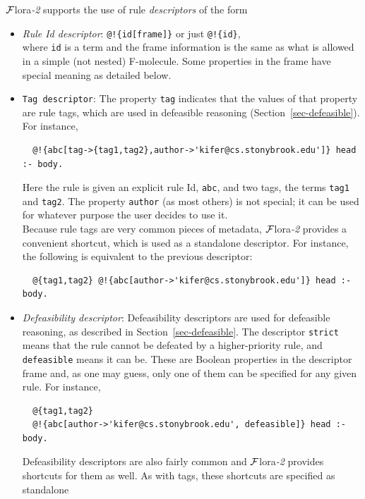\documentclass[11pt]{article}
\newcommand{\FLORA}{{\mbox{\sc ${\cal F}${lora}\rm\emph{-2}}}\xspace}
\begin{document}
\FLORA supports the use of rule \emph{descriptors} of the form
\begin{itemize}
\item  \emph{Rule Id descriptor}:   \texttt{@!\{id[frame]\}}  or just \texttt{@!\{id\}}, \\
  where \texttt{id} is a term and the frame information is the same as what
  is allowed in a simple (not nested) F-molecule.
  Some properties in the frame have special meaning as detailed below.
\item \texttt{Tag descriptor}:
  The property \texttt{tag} indicates that the values of that property are
  rule tags, which are used in defeasible reasoning
  (Section~\ref{sec-defeasible}). For instance,
\begin{verbatim}
  @!{abc[tag->{tag1,tag2},author->'kifer@cs.stonybrook.edu']} head :- body.  
\end{verbatim}
  Here the rule is given an explicit rule Id, \texttt{abc}, and
  two tags, the terms \texttt{tag1} and
  \texttt{tag2}. The
  property \texttt{author} (as most others) is not special; it can be used
  for whatever purpose the user decides to use it.
  \\
  Because rule tags are very common pieces of metadata, \FLORA provides a
  convenient shortcut, which is used as a standalone descriptor. For
  instance, the following is equivalent to the previous descriptor:
\begin{verbatim}
  @{tag1,tag2} @!{abc[author->'kifer@cs.stonybrook.edu']} head :- body.
\end{verbatim}
\item \emph{Defeasibility descriptor}:
  Defeasibility descriptors are used for defeasible
  reasoning, as described in Section~\ref{sec-defeasible}. The descriptor
  \texttt{strict} means that the rule cannot be defeated by a
  higher-priority rule, and \texttt{defeasible} means it can be. These are
  Boolean properties in the descriptor frame and, as one may guess, only
  one of them can be specified for any given rule. For instance,
\begin{verbatim}
  @{tag1,tag2}
  @!{abc[author->'kifer@cs.stonybrook.edu', defeasible]} head :- body.
\end{verbatim}
  Defeasibility descriptors are also fairly common and \FLORA provides shortcuts for
  them as well. As with tags, these shortcuts are specified as standalone

\end{itemize}
\end{document}
